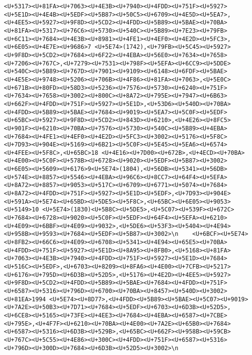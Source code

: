 \documentclass[
]{article}
\begin{document}
\begin{verbatim}
<U+5317><U+81FA><U+7063><U+4E3B><U+7940><U+4FDD><U+751F><U+5927><U+5E1D><U+4E4B><U+5EDF><U+5B87><U+50C5><U+6709><U+4E5D><U+5EA7>,<U+4EE5><U+5927><U+9F8D><U+5CD2><U+4FDD><U+5B89><U+5BAE><U+70BA><U+81FA><U+5317><U+76C6><U+5730><U+540C><U+5B89><U+7E23><U+79FB><U+6C11><U+7684><U+4E3B><U+8981><U+4FE1><U+4EF0><U+4E2D><U+5FC3>,<U+6E05><U+4E7E><U+9686>7 <U+5E74>(1742),<U+79FB><U+5C45><U+5927><U+9F8D><U+5CD2><U+7684><U+6F22><U+4EBA><U+56E0><U+7634><U+7658><U+7206><U+767C>,<U+7279><U+7531><U+798F><U+5EFA><U+6CC9><U+5DDE><U+540C><U+5B89><U+767D><U+7901><U+9109><U+6148><U+6FDF><U+5BAE><U+4E5E><U+9748><U+5206><U+706B><U+4F86><U+81FA><U+7063>,<U+5E0C><U+671B><U+80FD><U+58D3><U+5236><U+7576><U+5730><U+6240><U+751F><U+7634><U+7658><U+3002><U+800C><U+8A72><U+795E><U+7947><U+6B63><U+662F><U+4FDD><U+751F><U+5927><U+5E1D>,<U+53D6><U+540D><U+70BA><U+4FDD><U+5B89><U+5BAE><U+7684><U+9019><U+5EA7><U+5C0F><U+5EDF><U+65BC><U+5927><U+9F8D><U+5CD2><U+843D><U+6210>,<U+4E26><U+8FC5><U+901F><U+6210><U+70BA><U+7576><U+5730><U+540C><U+5B89><U+4EBA><U+7684><U+4FE1><U+4EF0><U+4E2D><U+5FC3><U+3002><U+5176><U+5F8C><U+7D93><U+904E><U+5169><U+6B21><U+5C0F><U+5E45><U+5EA6><U+6574><U+4FEE><U+5F8C>,<U+65BC>18 <U+4E16><U+7D00><U+672B>,<U+4ECD><U+70BA><U+4E00><U+5C0F><U+578B><U+6728><U+9020><U+5EDF><U+5B87><U+3002><U+6E05><U+5609><U+6176>9<U+5E74>(1804),<U+56DB><U+5341><U+56DB><U+574E><U+8857><U+5546><U+4EBA><U+96C6><U+8CC7><U+64F4><U+5EFA><U+8A72><U+8857><U+9053><U+517C><U+6709><U+6771><U+5074><U+7684><U+8A72><U+4FDD><U+751F><U+5927><U+5E1D><U+5EDF>,<U+7D93><U+904E><U+591A><U+5E74><U+65BD><U+5DE5><U+5F8C>,<U+65BC><U+6E05><U+9053><U+5149>10 <U+5E74>(1830)<U+5B8C><U+5DE5>,<U+5C07><U+539F><U+672C><U+7684><U+6728><U+9020><U+5C0F><U+5EDF><U+64F4><U+5EFA><U+6210><U+4E09><U+6BBF><U+4E09><U+9032>,<U+5DE6><U+53F3><U+5404><U+4E94><U+958B><U+9593><U+7684><U+5EDF><U+5B87><U+3002>\n    <U+6BCF><U+5E74><U+8FB2><U+66C6><U+4E09><U+6708><U+5341><U+4E94><U+65E5><U+70BA><U+4FDD><U+751F><U+5927><U+5E1D><U+8A95><U+8FB0>,<U+5168><U+81FA><U+7063><U+4E3B><U+7940><U+4FDD><U+751F><U+5927><U+5E1D><U+7684><U+516C><U+5EDF>,<U+6703><U+8209><U+8FA6><U+4E00><U+7CFB><U+5217><U+6176><U+795D><U+6D3B><U+52D5>,<U+5176><U+4E2D><U+4EE5><U+5927><U+9F8D><U+5CD2><U+4FDD><U+5B89><U+5BAE><U+7684><U+4FDD><U+751F><U+6587><U+5316><U+796D><U+6700><U+70BA><U+8457><U+540D><U+3002><U+81EA>1994 <U+5E74><U+8D77>,<U+4FDD><U+5B89><U+5BAE><U+5C07><U+9019><U+7A2E><U+50B3><U+7D71><U+7684><U+5EDF><U+6703><U+6D3B><U+52D5>,<U+6CE8><U+5165><U+73FE><U+4EE3><U+7684><U+4EBA><U+6587><U+7CBE><U+795E>,<U+4F7F><U+6210><U+70BA><U+4E00><U+7A2E><U+65B0><U+7684><U+6587><U+5316><U+6D3B><U+529B>,<U+65BC><U+662F><U+958B><U+59CB><U+767C><U+5C55><U+4E86><U+300C><U+4FDD><U+751F><U+6587><U+5316><U+796D><U+300D><U+7684><U+6D3B><U+52D5><U+3002>\n    
\end{verbatim}
\end{document}
